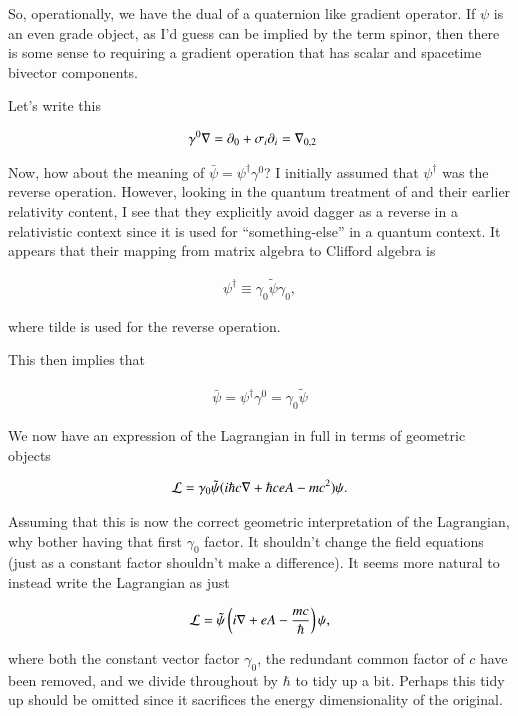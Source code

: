 So, operationally, we have the dual of a quaternion like gradient operator.  If $\psi$ is an even grade object, as I'd guess can be implied by
the term spinor, then there is some sense to requiring a gradient operation that has scalar and spacetime bivector components.

Let's write this

\begin{align*}
\gamma^0 \nabla &= \partial_0 + \sigma_i \partial_i = {\nabla}_{0,2}
\end{align*}

Now, how about the meaning of $\bar\psi = \psi^\dagger \gamma^0$?  I initially assumed that $\psi^\dagger$ was the reverse operation.
However, looking in the quantum treatment of \citep{doran2003gap} and their earlier relativity content, I see that they explicitly avoid dagger as a reverse in a relativistic context since it is used for ``something-else'' in a quantum context.  It appears that their mapping from matrix algebra to Clifford 
algebra is 

\begin{align*}
\psi^\dagger \equiv \gamma_0 \tilde{\psi} \gamma_0,
\end{align*}

where tilde is used for the reverse operation.

This then implies that 

\begin{align*}
\bar \psi = \psi^\dagger \gamma^0 = \gamma_0 \tilde{\psi}
\end{align*}

We now have an expression of the Lagrangian in full in terms of geometric objects

\begin{align}\label{eqn:diracLag:lag2}
\mathcal{L} = \gamma_0 \tilde{\psi} ( i \hbar c \nabla + \hbar c e A - mc^2) \psi.
\end{align}

Assuming that this is now the correct geometric interpretation of the Lagrangian, why bother having that first $\gamma_0$ factor.  It shouldn't change the field equations (just as a constant factor shouldn't make a difference).  It seems more natural to instead write the Lagrangian as just

\begin{align}\label{eqn:diracLag:lag3}
\mathcal{L} = \tilde{\psi} \left( i \nabla + e A - \frac{mc}{\hbar} \right) \psi,
\end{align}

where both the constant vector factor $\gamma_0$, the redundant common factor of $c$ have been removed, and we divide throughout by $\hbar$ to tidy up a bit.  Perhaps this tidy up should be omitted since it sacrifices the 
energy dimensionality of the original.

